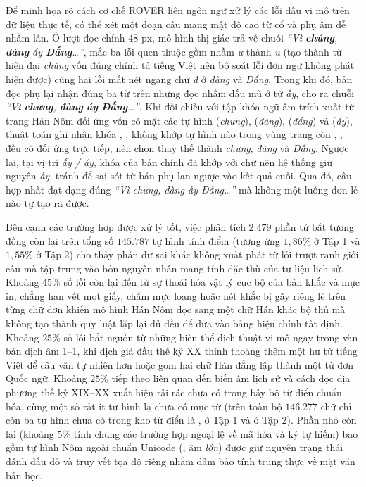 Để minh họa rõ cách cơ chế ROVER liên ngôn ngữ xử lý các lỗi dấu vi mô trên dữ liệu thực tế, có thể xét một đoạn câu mang mật độ cao từ cổ và phụ âm dễ nhầm lẫn. Ở lượt đọc chính $48\text{ px}$, mô hình thị giác trả về chuỗi \textit{``Vì \textbf{chúng}, \textbf{dàng} ấy \textbf{Dấng}\ldots''}, mắc ba lỗi quen thuộc gồm nhầm \textit{ư} thành \textit{u} (tạo thành từ hiện đại \textit{chúng} vốn đúng chính tả tiếng Việt nên bộ soát lỗi đơn ngữ không phát hiện được) cùng hai lỗi mất nét ngang chữ \textit{đ} ở \textit{dàng} và \textit{Dấng}. Trong khi đó, bản đọc phụ lại nhận đúng ba từ trên nhưng đọc nhầm dấu mũ ở từ \textit{ấy}, cho ra chuỗi \textit{``Vì \textbf{chưng}, \textbf{đàng} \textbf{áy} \textbf{Đấng}\ldots''}. Khi đối chiếu với tập khóa ngữ âm trích xuất từ trang Hán Nôm đối ứng vốn có mặt các tự hình  (\textit{chưng}),  (\textit{đàng}),  (\textit{đấng}) và  (\textit{ấy}), thuật toán ghi nhận khóa , ,  không khớp tự hình nào trong vùng trang còn , ,  đều có đối ứng trực tiếp, nên chọn thay thế thành \textit{chưng}, \textit{đàng} và \textit{Đấng}. Ngược lại, tại vị trí \textit{ấy / áy}, khóa  của bản chính đã khớp với chữ  nên hệ thống giữ nguyên \textit{ấy}, tránh để sai sót từ bản phụ lan ngược vào kết quả cuối. Qua đó, câu hợp nhất đạt dạng đúng \textit{``Vì chưng, đàng ấy Đấng\ldots''} mà không một luồng đơn lẻ nào tự tạo ra được.

Bên cạnh các trường hợp được xử lý tốt, việc phân tích $2.479$ phần tử bất tương đồng còn lại trên tổng số $145.787$ tự hình tính điểm (tương ứng $1{,}86\%$ ở Tập 1 và $1{,}55\%$ ở Tập 2) cho thấy phần dư sai khác không xuất phát từ lỗi trượt ranh giới câu mà tập trung vào bốn nguyên nhân mang tính đặc thù của tư liệu lịch sử. Khoảng $45\%$ số lỗi còn lại đến từ sự thoái hóa vật lý cục bộ của bản khắc và mực in, chẳng hạn vết mọt giấy, chấm mực loang hoặc nét khắc bị gãy riêng lẻ trên từng chữ đơn khiến mô hình Hán Nôm đọc sang một chữ Hán khác bộ thủ mà không tạo thành quy luật lặp lại đủ đều để đưa vào bảng hiệu chỉnh tất định. Khoảng $25\%$ số lỗi bắt nguồn từ những biến thể dịch thuật vi mô ngay trong văn bản dịch âm 1--1, khi dịch giả đầu thế kỷ XX thỉnh thoảng thêm một hư từ tiếng Việt để câu văn tự nhiên hơn hoặc gom hai chữ Hán đẳng lập thành một từ đơn Quốc ngữ. Khoảng $25\%$ tiếp theo liên quan đến biến âm lịch sử và cách đọc địa phương thế kỷ XIX--XX xuất hiện rải rác chưa có trong bảy bộ từ điển chuẩn hóa, cùng một số rất ít tự hình lạ chưa có mục từ (trên toàn bộ $146.277$ chữ chỉ còn ba tự hình chưa có trong kho từ điển là ,  ở Tập 1 và  ở Tập 2). Phần nhỏ còn lại (khoảng $5\%$ tính chung các trường hợp ngoại lệ về mã hóa và ký tự hiếm) bao gồm tự hình Nôm ngoài chuẩn Unicode  (, âm \textit{lớn}) được giữ nguyên trạng thái đánh dấu đỏ và truy vết tọa độ riêng nhằm đảm bảo tính trung thực về mặt văn bản học.
